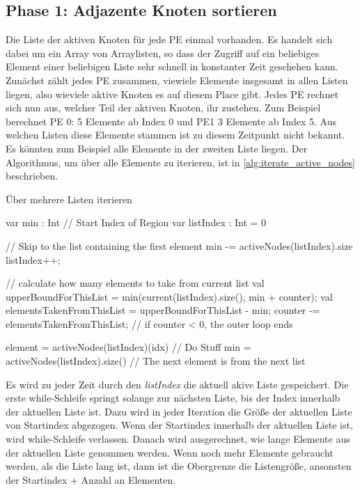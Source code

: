 \subsection{Phase 1: Adjazente Knoten sortieren} %
\label{sub:phase_1_invasive}
Die Liste der aktiven Knoten für jede PE einmal vorhanden. Es handelt sich dabei um ein Array von Arraylisten, so dass der Zugriff auf ein beliebiges Element einer beliebigen Liste sehr schnell in konstanter Zeit geschehen kann. Zunächst zählt jedes PE zusammen, viewiele Elemente insgesamt in allen Listen liegen, also wieviele aktive Knoten es auf diesem Place gibt. Jedes PE rechnet sich nun aus, welcher Teil der aktiven Knoten, ihr zustehen. Zum Beispiel berechnet PE 0: 5 Elemente ab Index 0 und PE1 3 Elemente ab Index 5. Aus welchen Listen diese Elemente stammen ist zu diesem Zeitpunkt nicht bekannt. Es könnten zum Beispiel alle Elemente in der zweiten Liste liegen. Der Algorithmus, um über alle Elemente zu iterieren, ist in \ref{alg:iterate_active_nodes} beschrieben.

\begin{algorithm}
	\caption{Über mehrere Listen iterieren}
	\label{alg:iterate_active_nodes}
	\begin{algorithmic}[1]
		\State var min : Int // Start Index of Region
		\State var listIndex : Int = 0

			// Skip to the list containing the first element
				\State min -= activeNodes(listIndex).size
				\State listIndex++;
			\EndWhile

			// calculate how many elements to take from current list
			\State val upperBoundForThisList = min(current(listIndex).size(), min + counter);
            \State val elementsTakenFromThisList = upperBoundForThisList - min;
            \State counter -= elementsTakenFromThisList; // if counter < 0, the outer loop ends

            	\State element = activeNodes(listIndex)(idx)
            	\State // Do Stuff
            \EndFor
            \State min = activeNodes(listIndex).size() // The next element is from the next list

		\EndFor
	\end{algorithmic}
\end{algorithm}
Es wird zu jeder Zeit durch den \textit{listIndex} die aktuell akive Liste gespeichert. Die erste while-Schleife springt solange zur nächsten Liste, bis der Index innerhalb der aktuellen Liste ist. Dazu wird in jeder Iteration die Größe der aktuellen Liste von Startindex abgezogen. Wenn der Startindex innerhalb der aktuellen Liste ist, wird while-Schleife verlassen. Danach wird ausgerechnet, wie lange Elemente aus der aktuellen Liste genommen werden. Wenn noch mehr Elemente gebraucht werden, als die Liste lang ist, dann ist die Obergrenze die Listengröße, ansonsten der Startindex + Anzahl an Elementen.

